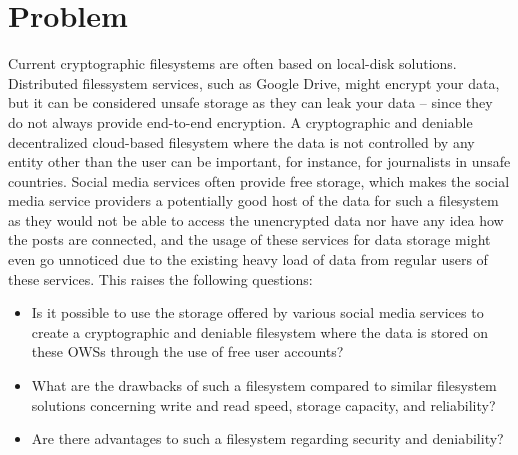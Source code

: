 
\section{Problem}
\label{sec:problem}

Current cryptographic filesystems are often based on \mbox{local-disk} solutions. Distributed filessystem services, such as Google Drive, might encrypt your data, but it can be considered unsafe storage as they can leak your data -- since they do not always provide \mbox{end-to-end} encryption. A cryptographic and deniable decentralized \mbox{cloud-based} filesystem where the data is not controlled by any entity other than the user can be important, for instance, for journalists in unsafe countries. Social media services often provide free storage, which makes the social media service providers a potentially good host of the data for such a filesystem as they would not be able to access the unencrypted data nor have any idea how the posts are connected, and the usage of these services for data storage might even go unnoticed due to the existing heavy load of data from regular users of these services. This raises the following questions:
\begin{itemize}
    \item Is it possible to use the storage offered by various social media services to create a cryptographic and deniable filesystem where the data is stored on these \glspl{OWS} through the use of free user accounts? 
    
    \item What are the drawbacks of such a filesystem compared to similar filesystem solutions concerning write and read speed, storage capacity, and reliability?
    
    \item Are there advantages to such a filesystem regarding security and deniability? 
\end{itemize}



